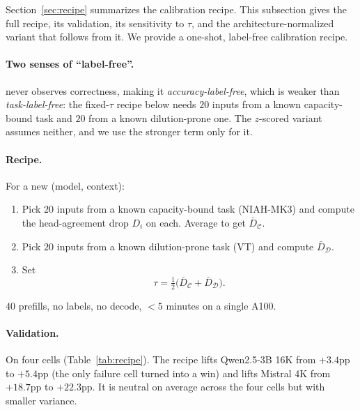 Section~\ref{sec:recipe} summarizes the calibration recipe. This
subsection gives the full recipe, its validation, its sensitivity to
$\tau$, and the architecture-normalized variant that follows from it.
We provide a one-shot, label-free calibration recipe.

\paragraph{Two senses of ``label-free''.} \method never observes correctness,
making it \emph{accuracy-label-free}, which is weaker than
\emph{task-label-free}: the fixed-$\tau$ recipe below needs $20$ inputs from
a known capacity-bound task and $20$ from a known dilution-prone one. The
$z$-scored variant assumes neither, and we use the stronger term only for it.

\paragraph{Recipe.} For a new (model, context):
\begin{enumerate}
  \item Pick $20$ inputs from a known capacity-bound task (NIAH-MK3) and
  compute the head-agreement drop $D_i$ on each. Average to get
  $\bar D_{\mathcal C}$.
  \item Pick $20$ inputs from a known dilution-prone task (VT) and compute
  $\bar D_{\mathcal D}$.
  \item Set
  \begin{equation}
  \label{eq:tau}
  \tau = \tfrac{1}{2}\bigl(\bar D_{\mathcal C} + \bar D_{\mathcal D}\bigr).
  \end{equation}
\end{enumerate}
$40$ prefills, no labels, no decode, $<5$ minutes on a single A100.

\paragraph{Validation.} On four cells (Table~\ref{tab:recipe}). The recipe
lifts Qwen2.5-3B 16K from $+3.4$pp to $+5.4$pp (the only failure cell turned
into a win) and lifts Mistral 4K from $+18.7$pp to $+22.3$pp. It is
neutral on average across the four cells but with smaller variance.

